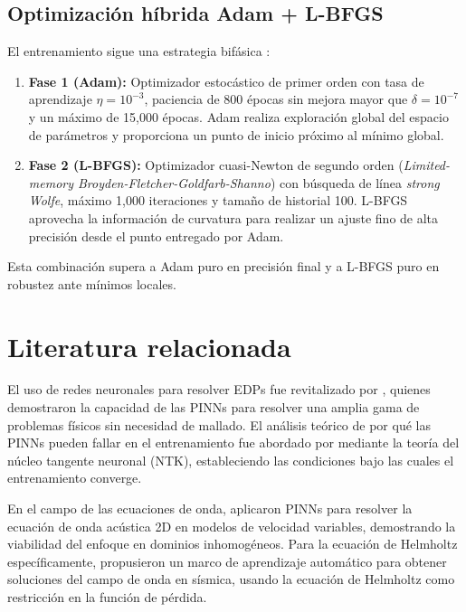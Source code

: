 \subsection{Optimización híbrida Adam + L-BFGS}

El entrenamiento sigue una estrategia bifásica \parencite{wang2021failure}:

\begin{enumerate}
    \item \textbf{Fase 1 (Adam):} Optimizador estocástico de primer orden
    \parencite{kingma2015adam} con tasa de aprendizaje $\eta = 10^{-3}$,
    paciencia de 800 épocas sin mejora mayor que $\delta = 10^{-7}$ y un
    máximo de 15{,}000 épocas. Adam realiza exploración global del espacio
    de parámetros y proporciona un punto de inicio próximo al mínimo global.

    \item \textbf{Fase 2 (L-BFGS):} Optimizador cuasi-Newton de segundo orden
    (\textit{Limited-memory Broyden-Fletcher-Goldfarb-Shanno})
    \parencite{nocedal2006numerical} con búsqueda de línea \textit{strong Wolfe},
    máximo 1{,}000 iteraciones y tamaño de historial 100. L-BFGS aprovecha la
    información de curvatura para realizar un ajuste fino de alta precisión
    desde el punto entregado por Adam.
\end{enumerate}

Esta combinación supera a Adam puro en precisión final y a L-BFGS puro en
robustez ante mínimos locales.

\section{Literatura relacionada}

El uso de redes neuronales para resolver EDPs fue revitalizado por
\textcite{raissi2019physics}, quienes demostraron la capacidad de las PINNs
para resolver una amplia gama de problemas físicos sin necesidad de mallado.
El análisis teórico de por qué las PINNs pueden fallar en el entrenamiento fue
abordado por \textcite{wang2022ntk} mediante la teoría del núcleo tangente
neuronal (NTK), estableciendo las condiciones bajo las cuales el entrenamiento
converge.

En el campo de las ecuaciones de onda, \textcite{moseley2020wave} aplicaron
PINNs para resolver la ecuación de onda acústica 2D en modelos de velocidad
variables, demostrando la viabilidad del enfoque en dominios inhomogéneos.
Para la ecuación de Helmholtz específicamente, \textcite{alkhalifah2021wavefield}
propusieron un marco de aprendizaje automático para obtener soluciones del campo
de onda en sísmica, usando la ecuación de Helmholtz como restricción en la
función de pérdida.

